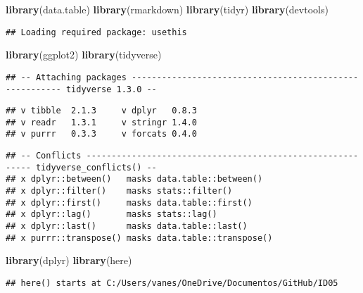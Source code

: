 \documentclass[
]{article}
\newenvironment{Shaded}{\begin{snugshade}}{\end{snugshade}}
\newcommand{\KeywordTok}[1]{\textcolor[rgb]{0.13,0.29,0.53}{\textbf{#1}}}
\newcommand{\NormalTok}[1]{#1}
\begin{document}
\begin{Shaded}
\begin{Highlighting}[]
\KeywordTok{library}\NormalTok{(data.table)}
\KeywordTok{library}\NormalTok{(rmarkdown)}
\KeywordTok{library}\NormalTok{(tidyr)}
\KeywordTok{library}\NormalTok{(devtools)}
\end{Highlighting}
\end{Shaded}

\begin{verbatim}
## Loading required package: usethis
\end{verbatim}

\begin{Shaded}
\begin{Highlighting}[]
\KeywordTok{library}\NormalTok{(ggplot2)}
\KeywordTok{library}\NormalTok{(tidyverse)}
\end{Highlighting}
\end{Shaded}

\begin{verbatim}
## -- Attaching packages -------------------------------------------------------- tidyverse 1.3.0 --
\end{verbatim}

\begin{verbatim}
## v tibble  2.1.3     v dplyr   0.8.3
## v readr   1.3.1     v stringr 1.4.0
## v purrr   0.3.3     v forcats 0.4.0
\end{verbatim}

\begin{verbatim}
## -- Conflicts ----------------------------------------------------------- tidyverse_conflicts() --
## x dplyr::between()   masks data.table::between()
## x dplyr::filter()    masks stats::filter()
## x dplyr::first()     masks data.table::first()
## x dplyr::lag()       masks stats::lag()
## x dplyr::last()      masks data.table::last()
## x purrr::transpose() masks data.table::transpose()
\end{verbatim}

\begin{Shaded}
\begin{Highlighting}[]
\KeywordTok{library}\NormalTok{(dplyr)}
\KeywordTok{library}\NormalTok{(here)}
\end{Highlighting}
\end{Shaded}

\begin{verbatim}
## here() starts at C:/Users/vanes/OneDrive/Documentos/GitHub/ID05
\end{verbatim}
\end{document}
